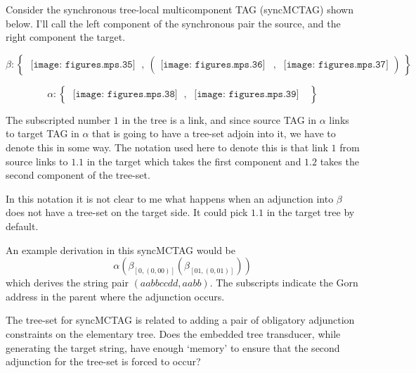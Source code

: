 \documentclass{article}
\begin{document}
Consider the synchronous tree-local multicomponent TAG (syncMCTAG) shown below. I'll call the left component of the synchronous pair the source, and the right component the target. 

\[ \beta: \left\{ \ 
\begin{array}{c}
\texttt{[image: figures.mps.35]}
\end{array}
\ , \ 
\left( 
\begin{array}{ccc}
\texttt{[image: figures.mps.36]} & , &  
\texttt{[image: figures.mps.37]} 
\end{array}
\right) \ 
\right\} \]

\[ \alpha: \left\{ \ 
\begin{array}{c}
\texttt{[image: figures.mps.38]}
\end{array}
\ , \ 
\begin{array}{c}
\texttt{[image: figures.mps.39]} \ \ 
\end{array}
\ 
\right\} \]

The subscripted number $1$ in the tree is a link, and since source TAG in $\alpha$ links to target TAG in $\alpha$ that is going to have a tree-set adjoin into it, we have to denote this in some way. The notation used here to denote this is that link $1$ from source links to $1.1$ in the target which takes the first component and $1.2$ takes the second component of the tree-set. 

In this notation it is not clear to me what happens when an adjunction into $\beta$ does not have a tree-set on the target side. It could pick $1.1$ in the target tree by default.

An example derivation in this syncMCTAG would be 
\[ \alpha(\beta_{[0,(0,00)]}(\beta_{[01,(0,01)]})) \]
which derives the string pair $(aabbccdd, aabb)$. The subscripts indicate the Gorn address in the parent where the adjunction occurs.

The tree-set for syncMCTAG is related to adding a pair of obligatory adjunction constraints on the elementary tree. Does the embedded tree transducer, while generating the target string, have enough `memory' to ensure that the second adjunction for the tree-set is forced to occur? 
\end{document}
